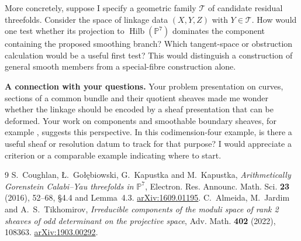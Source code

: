 \documentclass[11pt,a4paper]{article}
\newcommand{\PP}{\mathbb P}
\DeclareMathOperator{\Hilb}{Hilb}
\begin{document}
More concretely, suppose I specify a geometric family $\mathcal T$
of candidate residual threefolds. Consider the space of linkage data
$(X,Y,Z)$ with $Y\in\mathcal T$. How would one test whether its projection
to $\Hilb(\PP^7)$ dominates the component containing the proposed
smoothing branch? Which tangent-space or obstruction calculation would
be a useful first test? This would distinguish a construction of general
smooth members from a special-fibre construction alone.

\textbf{A connection with your questions.}
Your problem presentation on curves, sections of a common bundle and
their quotient sheaves made me wonder whether the linkage should be
encoded by a sheaf presentation that can be deformed. Your work on
components and smoothable boundary sheaves, for example \cite{AJT},
suggests this perspective. In this codimension-four example, is there
a useful sheaf or resolution datum to track for that purpose?
I would appreciate a criterion or a comparable example indicating
where to start.

\vspace{-5pt}
\begin{thebibliography}{9}
\small
\setlength{\itemsep}{2pt}
S.~Coughlan, \L.~Go\l\k{e}biowski, G.~Kapustka and M.~Kapustka,
\emph{Arithmetically Gorenstein Calabi--Yau threefolds in $\PP^7$},
Electron. Res. Announc. Math. Sci. \textbf{23} (2016), 52--68,
\S4.4 and Lemma~4.3.
\href{https://arxiv.org/abs/1609.01195}{arXiv:1609.01195}.
C.~Almeida, M.~Jardim and A.~S.~Tikhomirov,
\emph{Irreducible components of the moduli space of rank 2 sheaves of
odd determinant on the projective space},
Adv. Math. \textbf{402} (2022), 108363.
\href{https://arxiv.org/abs/1903.00292}{arXiv:1903.00292}.
\end{thebibliography}
\end{document}
